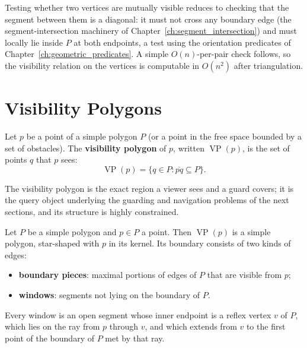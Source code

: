 Testing whether two vertices are mutually visible reduces to checking that
the segment between them is a diagonal: it must not cross any boundary edge
(the segment-intersection machinery of Chapter~\ref{ch:segment_intersection})
and must locally lie inside $P$ at both endpoints, a test using the
orientation predicates of Chapter~\ref{ch:geometric_predicates}. A simple
$O(n)$-per-pair check follows, so the visibility relation on the vertices is
computable in $O(n^2)$ after triangulation.


\section{Visibility Polygons}
\label{sec:visibility_polygons}

\begin{definition}\label{def:vis_visibility_polygon}
  Let $p$ be a point of a simple polygon $P$ (or a point in the free space
  bounded by a set of obstacles). The \textbf{visibility polygon} of $p$,
  written $\operatorname{VP}(p)$, is the set of points $q$ that $p$ sees:
  \[
    \operatorname{VP}(p) = \{ q \in P : \overline{pq} \subseteq P \}.
  \]
\end{definition}

The visibility polygon is the exact region a viewer sees and a guard covers;
it is the query object underlying the guarding and navigation problems of
the next sections, and its structure is highly constrained.

\begin{theorem}\label{thm:vis_vp_structure}
  Let $P$ be a simple polygon and $p \in P$ a point. Then
  $\operatorname{VP}(p)$ is a simple polygon, star-shaped with $p$ in its
  kernel. Its boundary consists of two kinds of edges:
  \begin{itemize}
    \item \textbf{boundary pieces}: maximal portions of edges of $P$ that
      are visible from $p$;
    \item \textbf{windows}: segments not lying on the boundary of $P$.
  \end{itemize}
  Every window is an open segment whose inner endpoint is a reflex vertex
  $v$ of $P$, which lies on the ray from $p$ through $v$, and which extends
  from $v$ to the first point of the boundary of $P$ met by that ray.
\end{theorem}

